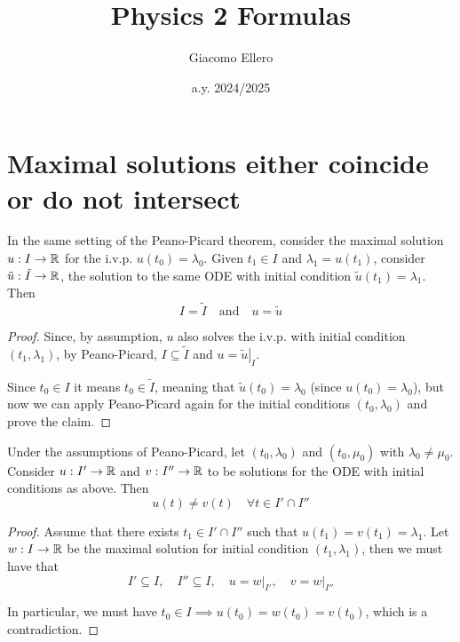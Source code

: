 \documentclass[12pt]{extarticle}
\title{Physics 2 Formulas}
\author{Giacomo Ellero}
\date{a.y. 2024/2025}
\numberwithin{equation}{section}
\begin{document}
\section{Maximal solutions either coincide or do not intersect}

\begin{theorem}{}{}
    In the same setting of the Peano-Picard theorem,
    consider the maximal solution $u: I \to \mathbb{R}$
    for the i.v.p. $u(t_0) = \lambda_0$.
    Given $t_1 \in I$ and $\lambda_1 = u(t_1)$,
    consider $\tilde{u}: \tilde I \to \mathbb{R}$,
    the solution to the same ODE with initial condition $\tilde{u}(t_1) = \lambda_1$.
    Then
    \begin{equation}
        I = \tilde I \quad \text{and} \quad u = \tilde u
    \end{equation}
\end{theorem}

\begin{proof}
    Since, by assumption, $u$ also solves the i.v.p. with initial condition $(t_1, \lambda_1)$,
    by Peano-Picard, $I \subseteq \tilde I$ and $u = \left. \tilde u \right|_I$.

    Since $t_0 \in I$ it means $t_0 \in \tilde I$, meaning that $\tilde u(t_0) = \lambda_0$
    (since $u(t_0) = \lambda_0$), but now we can apply Peano-Picard again for the initial conditions $(t_0, \lambda_0)$
    and prove the claim.
\end{proof}


\begin{theorem}{}{}
    Under the assumptions of Peano-Picard, let $(t_0, \lambda_0)$ and $(t_0, \mu_0)$ with $\lambda_0 \ne \mu_0$.
    Consider $u: I' \to \mathbb{R}$ and $v: I'' \to \mathbb{R}$ to be solutions for the ODE with initial conditions as above.
    Then
    \begin{equation}
        u(t) \neq v(t) \quad \forall t \in I' \cap I''
    \end{equation}
\end{theorem}

\begin{proof}
    Assume that there exists $t_1 \in I' \cap I''$ such that $u(t_1) = v(t_1) = \lambda_1$.
    Let $w: I \to \mathbb{R}$ be the maximal solution for initial condition $(t_1, \lambda_1)$,
    then we must have that
    \begin{equation}
        I'\subseteq I, \quad I'' \subseteq I, \quad u = \left. w\right|_{I'}, \quad v = \left. w\right|_{I''}
    \end{equation}

    In particular, we must have $t_0 \in I \implies u(t_0) = w(t_0) = v(t_0)$, which is a contradiction.
\end{proof}
\end{document}
